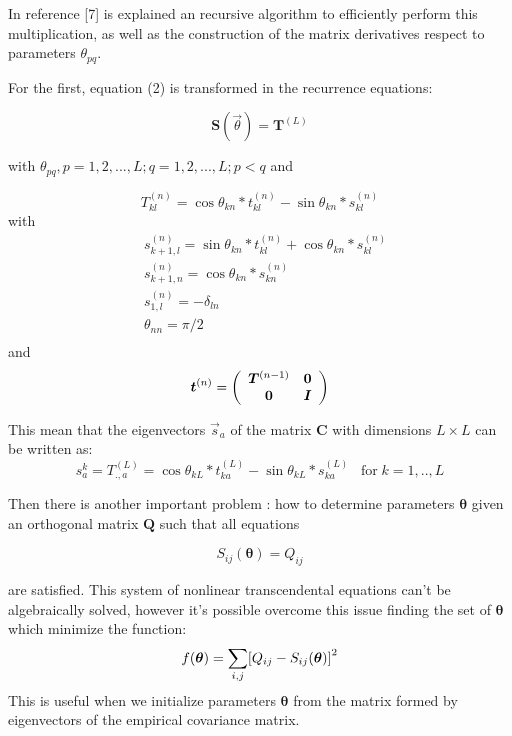 \documentclass[preprint,amsmath,amssymb,superscriptaddress,showpacs,pre]{revtex4-1}
\let\originalleft\left
\let\originalright\right
\renewcommand{\left}{\mathopen{}\mathclose\bgroup\originalleft}
\renewcommand{\right}{\aftergroup\egroup\originalright}
\begin{document}
 In reference [7] is explained an recursive algorithm to efficiently perform this multiplication,  as well as the   construction of the matrix   derivatives respect to parameters $\theta_{pq}$. 

For the first, equation  (2) is transformed in  the recurrence equations:

\begin{equation}
\bm S(\vec{\theta} )=\bm T^{(L)}
\end{equation}

with $\theta_ {pq}, p =1,2, ..., L; q =1,2, ..., L; p <q$ and 


\begin{equation}
T^{(n)}_{kl}=\cos\theta_{kn} * t^{(n)}_{kl}-\sin\theta_{kn}* s^{(n)}_{kl}
\end{equation}
with
\begin{equation}
\begin{split}
&s^{(n)}_{k+1,l}=\sin\theta_{kn} * t^{(n)}_{kl}+\cos\theta_{kn}*s^{(n)}_{kl}\\
&s^{(n)}_{k+1,n}=\cos\theta_{kn}*s^{(n)}_{kn}\\
&s^{(n)}_{1,l}=-\delta_{ln}\\
&\theta_{nn}=\pi/2\\
&\end{split}
\end{equation}
and
\begin{equation} 
\bm t^{(n)} =  \left(
\begin{array}{cc}
\bm T^{(n-1)} & \bm 0  \\
\bm 0 &  \bm I\\

\end{array}
\right)
\end{equation}

This mean that the eigenvectors $\vec{s}_a$ of the matrix $\bm C$ with dimensions $L\times L$ can be written as:
\begin{equation}
s^{k}_a=T^{(L)}_{.,a}=\cos\theta_{kL} * t^{(L)}_{ka}-\sin\theta_{kL}* s^{(L)}_{ka} \;\;\; \text{for} \;k=1,..,L
\end{equation}



Then there is another  important problem : how to determine parameters $\bm \theta$  given an orthogonal matrix $\bm Q$ such that all equations 

$$S_{ij}(\bm \theta)=Q_{ij}$$

are satisfied. This system of nonlinear transcendental equations  can't be algebraically solved, however it's possible overcome  this issue finding the set of $\bm \theta$ which minimize the function:   
\begin{equation}
f(\bm \theta)=\sum_{i,j}\left[ Q_{ij}-S_{ij}(\bm \theta)\right] ^2
\end{equation}
This is useful when we initialize parameters $\bm \theta$  from the matrix formed by eigenvectors of the empirical covariance matrix.
\end{document}
